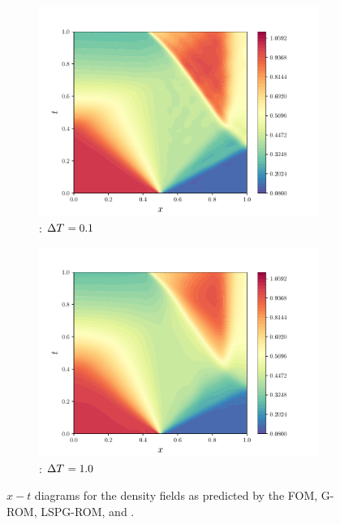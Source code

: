 \begin{figure}
\begin{center}
\begin{subfigure}[t]{0.48\textwidth}
\includegraphics[width=1.\linewidth]{figs/sod/xt_w50.pdf}
\caption{\methodAcronym: $\Delta T^{} = 0.1$}
\end{subfigure}
\begin{subfigure}[t]{0.48\textwidth}
\includegraphics[width=1.\linewidth]{figs/sod/xt_w500.pdf}
\caption{\methodAcronym: $\Delta T^{} = 1.0$}
\end{subfigure}
\caption{$x-t$ diagrams for the density fields as predicted by the FOM, G-ROM, LSPG-ROM, and \methodAcronymROMs.}
\label{fig:sod_xt}
\end{center}
\end{figure}

